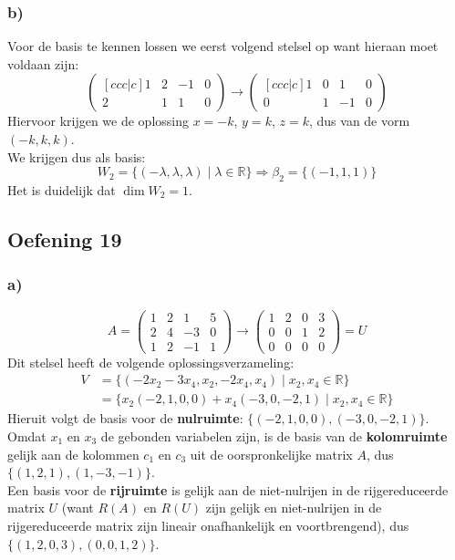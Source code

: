 \documentclass[lineaire_algebra_oplossingen.tex]{subfiles}
\begin{document}
\subsubsection*{b)}
Voor de basis te kennen lossen we eerst volgend stelsel op want hieraan moet voldaan zijn:
\[
\begin{pmatrix}[ccc|c]
1 & 2 & -1 & 0 \\
2 & 1 &  1 & 0
\end{pmatrix}
\longrightarrow
\begin{pmatrix}[ccc|c]
1 & 0 &  1 & 0 \\
0 & 1 & -1 & 0
\end{pmatrix}
\]
Hiervoor krijgen we de oplossing $x=-k$, $y= k$, $z=k$, dus van de vorm $(-k,k,k)$.\\
We krijgen dus als basis:
\[
W_2 = \{(-\lambda, \lambda, \lambda)\mid\lambda \in \mathbb{R}\}
\Longrightarrow
\beta_2 = \{ (-1,1,1) \}
\]
Het is duidelijk dat $\dim W_2 = 1$.

\subsection{Oefening 19}
\subsubsection*{a)}
\[
A =
\begin{pmatrix}
1 & 2 &  1 & 5 \\
2 & 4 & -3 & 0 \\
1 & 2 & -1 & 1
\end{pmatrix}
\longrightarrow
\begin{pmatrix}
1 & 2 & 0 & 3 \\
0 & 0 & 1 & 2 \\
0 & 0 & 0 & 0
\end{pmatrix}
= U
\]
Dit stelsel heeft de volgende oplossingsverzameling:
\begin{align*}
V
&= \{ (-2x_2-3x_4,x_2,-2x_4,x_4) \mid x_2,x_4 \in \mathbb{R} \} \\
&= \{ x_2(-2,1,0,0) + x_4(-3,0,-2,1) \mid x_2,x_4 \in \mathbb{R} \}
\end{align*}
Hieruit volgt de basis voor de \textbf{nulruimte}: $\{ (-2,1,0,0), (-3,0,-2,1) \}$.\\
Omdat $x_1$ en $x_3$ de gebonden variabelen zijn, is de basis van de \textbf{kolomruimte} gelijk aan de kolommen $c_1$ en $c_3$ uit de oorspronkelijke matrix $A$, dus $\{(1,2,1),(1,-3,-1)\}$.\\
Een basis voor de \textbf{rijruimte} is gelijk aan de niet-nulrijen in de rijgereduceerde matrix $U$ (want $R(A)$ en $R(U)$ zijn gelijk en niet-nulrijen in de rijgereduceerde matrix zijn lineair onafhankelijk en voortbrengend), dus $\{(1,2,0,3),(0,0,1,2)\}$.
\end{document}
